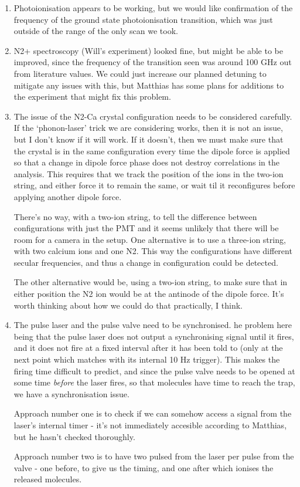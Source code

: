 \documentclass[11pt]{article}
\begin{document}
\begin{enumerate}
\item Photoionisation appears to be working, but we would like
   confirmation of the frequency of the ground state photoionisation
   transition, which was just outside of the range of the only scan we
   took.
\item N2+ spectroscopy (Will's experiment) looked fine, but might be able
   to be improved, since the frequency of the transition seen was
   around 100 GHz out from literature values. We could just increase
   our planned detuning to mitigate any issues with this, but Matthias
   has some plans for additions to the experiment that might fix this
   problem.
\item The issue of the N2-Ca crystal configuration needs to be considered
   carefully. If the `phonon-laser' trick we are considering works,
   then it is not an issue, but I don't know if it will work. If it
   doesn't, then we must make sure that the crystal is in the same
   configuration every time the dipole force is applied so that a
   change in dipole force phase does not destroy correlations in the
   analysis. This requires that we track the position of the ions in
   the two-ion string, and either force it to remain the same, or wait
   til it reconfigures before applying another dipole force. 

   There's no way, with a two-ion string, to tell the difference
   between configurations with just the PMT and it seems unlikely that
   there will be room for a camera in the setup. One alternative is to
   use a three-ion string, with two calcium ions and one N2. This way
   the configurations have different secular frequencies, and thus a
   change in configuration could be detected.

   The other alternative would be, using a two-ion string, to make
   sure that in either position the N2 ion would be at the antinode of
   the dipole force. It's worth thinking about how we could do that
   practically, I think.
\item The pulse laser and the pulse valve need to be synchronised. he
   problem here being that the pulse laser does not output a
   synchronising signal until it fires, and it does not fire at a
   fixed interval after it has been told to (only at the next point
   which matches with its internal 10 Hz trigger). This makes the
   firing time difficult to predict, and since the pulse valve needs
   to be opened at some time \emph{before} the laser fires, so that
   molecules have time to reach the trap, we have a synchronisation
   issue.

   Approach number one is to check if we can somehow access a signal
   from the laser's internal timer - it's not immediately accesible
   according to Matthias, but he hasn't checked thoroughly. 

   Approach number two is to have two pulsed from the laser per pulse
   from the valve - one before, to give us the timing, and one after
   which ionises the released molecules.
\end{enumerate}
\end{document}
